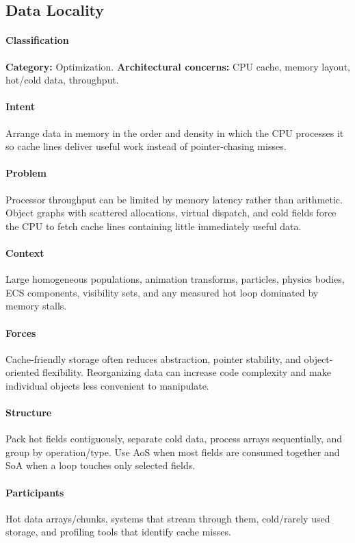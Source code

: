 \documentclass[11pt]{article}
\begin{document}
\subsection{Data Locality}\label{pat:data-locality}
\paragraph{Classification} \textbf{Category:} Optimization. \textbf{Architectural concerns:} CPU cache, memory layout, hot/cold data, throughput.
\paragraph{Intent} Arrange data in memory in the order and density in which the CPU processes it so cache lines deliver useful work instead of pointer-chasing misses.
\paragraph{Problem} Processor throughput can be limited by memory latency rather than arithmetic. Object graphs with scattered allocations, virtual dispatch, and cold fields force the CPU to fetch cache lines containing little immediately useful data.
\paragraph{Context} Large homogeneous populations, animation transforms, particles, physics bodies, ECS components, visibility sets, and any measured hot loop dominated by memory stalls.
\paragraph{Forces} Cache-friendly storage often reduces abstraction, pointer stability, and object-oriented flexibility. Reorganizing data can increase code complexity and make individual objects less convenient to manipulate.
\paragraph{Structure} Pack hot fields contiguously, separate cold data, process arrays sequentially, and group by operation/type. Use AoS when most fields are consumed together and SoA when a loop touches only selected fields.
\paragraph{Participants} Hot data arrays/chunks, systems that stream through them, cold/rarely used storage, and profiling tools that identify cache misses.
\end{document}
